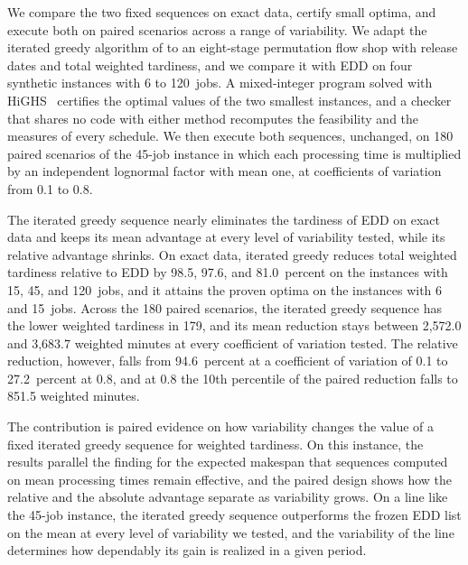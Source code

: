 \sumpara We compare the two fixed sequences on exact data, certify small optima, and execute both on paired scenarios across a range of variability. \sumparaend
\fin We adapt the iterated greedy algorithm of \citet{ruiz2008igwt} to an eight-stage permutation flow shop with release dates and total weighted tardiness, and we compare it with EDD on four synthetic instances with 6 to 120~jobs. \fine
\fin A mixed-integer program solved with HiGHS~\cite{highs} certifies the optimal values of the two smallest instances, and a checker that shares no code with either method recomputes the feasibility and the measures of every schedule. \fine
\fin We then execute both sequences, unchanged, on 180 paired scenarios of the 45-job instance in which each processing time is multiplied by an independent lognormal factor with mean one, at coefficients of variation from 0.1 to 0.8. \fine

\sumpara The iterated greedy sequence nearly eliminates the tardiness of EDD on exact data and keeps its mean advantage at every level of variability tested, while its relative advantage shrinks. \sumparaend
\fin On exact data, iterated greedy reduces total weighted tardiness relative to EDD by 98.5, 97.6, and 81.0~percent on the instances with 15, 45, and 120~jobs, and it attains the proven optima on the instances with 6 and 15~jobs. \fine
\fin Across the 180 paired scenarios, the iterated greedy sequence has the lower weighted tardiness in 179, and its mean reduction stays between 2,572.0 and 3,683.7 weighted minutes at every coefficient of variation tested. \fine
\fin The relative reduction, however, falls from 94.6~percent at a coefficient of variation of 0.1 to 27.2~percent at 0.8, and at 0.8 the 10th percentile of the paired reduction falls to 851.5 weighted minutes. \fine

\sumpara The contribution is paired evidence on how variability changes the value of a fixed iterated greedy sequence for weighted tardiness. \sumparaend
\fin On this instance, the results parallel the finding for the expected makespan that sequences computed on mean processing times remain effective, and the paired design shows how the relative and the absolute advantage separate as variability grows. \fine
\fin On a line like the 45-job instance, the iterated greedy sequence outperforms the frozen EDD list on the mean at every level of variability we tested, and the variability of the line determines how dependably its gain is realized in a given period. \fine
